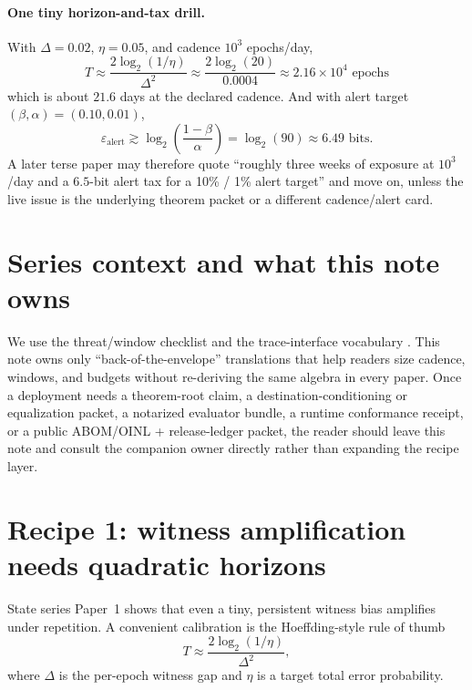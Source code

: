 \documentclass[11pt]{article}
\begin{document}
\paragraph{One tiny horizon-and-tax drill.}
With $\Delta=0.02$, $\eta=0.05$, and cadence $10^3$ epochs/day,
\[
T \approx \frac{2\log_2(1/\eta)}{\Delta^2}
   \approx \frac{2\log_2(20)}{0.0004}
   \approx 2.16\times 10^4\text{ epochs}
\]
which is about $21.6$ days at the declared cadence. And with alert target $(\beta,\alpha)=(0.10,0.01)$,
\[
\varepsilon_{\mathrm{alert}} \gtrsim \log_2\!\left(\frac{1-\beta}{\alpha}\right)
= \log_2(90) \approx 6.49\text{ bits}.
\]
A later terse paper may therefore quote ``roughly three weeks of exposure at $10^3$/day and a $6.5$-bit alert tax for a 10\% / 1\% alert target'' and move on, unless the live issue is the underlying theorem packet or a different cadence/alert card.

\section{Series context and what this note owns}
We use the threat/window checklist \cite{series:threatwindows} and the trace-interface vocabulary \cite{series:traceifaces}.
This note owns only ``back-of-the-envelope'' translations that help readers size cadence, windows, and budgets without re-deriving the same algebra in every paper.
Once a deployment needs a theorem-root claim, a destination-conditioning or equalization packet, a notarized evaluator bundle, a runtime conformance receipt, or a public ABOM/OINL + release-ledger packet, the reader should leave this note and consult the companion owner directly rather than expanding the recipe layer.\cite{state1,state2,state3,series:mceq,series:eval1,series:opB,series:abom,series:releaseproperty}

\section{Recipe 1: witness amplification needs quadratic horizons}
State series Paper~1 \cite{state1} shows that even a tiny, persistent witness bias amplifies under repetition.
A convenient calibration is the Hoeffding-style rule of thumb
\[
T \approx \frac{2\log_2(1/\eta)}{\Delta^2},
\]
where $\Delta$ is the per-epoch witness gap and $\eta$ is a target total error probability.
\end{document}
